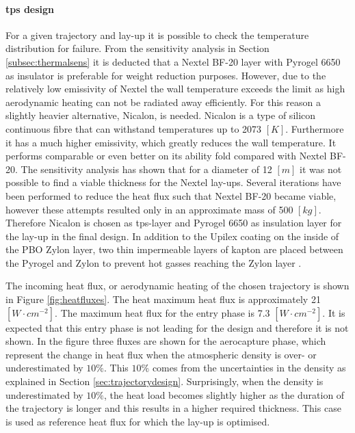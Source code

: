 
\paragraph{\acrlong{tps} design}
For a given trajectory and lay-up it is possible to check the temperature distribution for failure. From the sensitivity analysis in Section \ref{subsec:thermalsens} it is deducted that a Nextel BF-20 layer with Pyrogel 6650 as insulator is preferable for weight reduction purposes. However, due to the relatively low emissivity of Nextel the wall temperature exceeds the limit as high aerodynamic heating can not be radiated away efficiently. For this reason a slightly heavier alternative, Nicalon, is needed. Nicalon is a type of silicon continuous fibre that can withstand temperatures up to 2073 $\left[K\right]$. Furthermore it has a much higher emissivity, which greatly reduces the wall temperature. It performs comparable or even better on its ability fold compared with Nextel BF-20\cite{Corso2011}. The sensitivity analysis has shown that for a diameter of 12 $\left[m\right]$ it was not possible to find a viable thickness for the Nextel lay-ups. Several iterations have been performed to reduce the heat flux such that Nextel BF-20 became viable, however these attempts resulted only in an approximate mass of 500 $\left[kg\right]$. Therefore Nicalon is chosen as \gls{tps}-layer and Pyrogel 6650 as insulation layer for the lay-up in the final design. In addition to the Upilex coating on the inside of the PBO Zylon layer, two thin impermeable layers of kapton are placed between the Pyrogel and Zylon to prevent hot gasses reaching the Zylon layer \cite{Hughes2005,Litton2011}.

The incoming heat flux, or aerodynamic heating of the chosen trajectory is shown in Figure \ref{fig:heatfluxes}. The heat maximum heat flux is approximately 21 $\left[W\cdot cm^{-2}\right]$. The maximum heat flux for the entry phase is 7.3 $\left[W\cdot cm^{-2}\right]$. It is expected that this entry phase is not leading for the design and therefore it is not shown. In the figure three fluxes are shown for the aerocapture phase, which represent the change in heat flux when the atmospheric density is over- or underestimated by $10\%$. This $10\%$ comes from the uncertainties in the density as explained in Section \ref{sec:trajectorydesign}. Surprisingly, when the density is underestimated by $10\%$, the heat load becomes slightly higher as the duration of the trajectory is longer and this results in a higher required thickness. This case is used as reference heat flux for which the lay-up is optimised.


